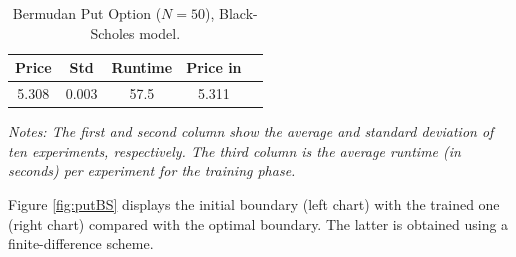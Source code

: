 \begin{table}[ht]
  \centering
  \caption{Bermudan Put Option ($N=50$), Black-Scholes model.  
 }
  \begin{tabular}{|c| c| c| c| c|}
 \hline
     Price&  Std& Runtime  & Price in \cite{Becker2}\\
  \hline 
  5.308 & 0.003 &  57.5 & 5.311 \\
  \hline
\end{tabular}
\vspace{2mm}

\scriptsize{
\textit{Notes: The first and second column show the average and standard deviation of ten experiments, respectively. The third column is the average runtime (in seconds) per experiment for the training phase. }}
\label{tab:resultPutBS}
  \end{table}

Figure \ref{fig:putBS} displays the initial boundary (left chart) with the trained one (right chart) compared with the optimal boundary. The latter is obtained using a finite-difference scheme.  

    

    

    

